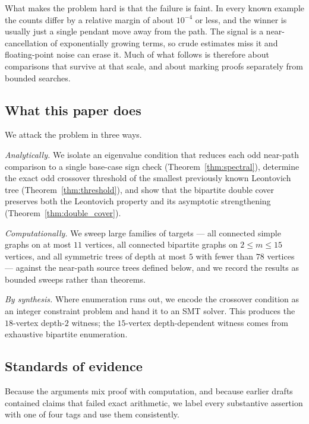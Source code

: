 What makes the problem hard is that the failure is faint. In every known
example the counts differ by a relative margin of about $10^{-4}$ or
less, and the winner is usually just a single pendant move away from the
path. The signal is a near-cancellation of exponentially growing terms,
so crude estimates miss it and floating-point noise can erase it. Much
of what follows is therefore about comparisons that survive at that
scale, and about marking proofs separately from bounded searches.

\subsection{What this paper does}

We attack the problem in three ways.

\emph{Analytically.} We isolate an eigenvalue condition that reduces each
odd near-path comparison to a single base-case sign check
(Theorem~\ref{thm:spectral}), determine the exact odd crossover
threshold of the smallest previously known Leontovich tree
(Theorem~\ref{thm:threshold}), and show that the bipartite double cover
preserves both the Leontovich property and its asymptotic strengthening
(Theorem~\ref{thm:double_cover}).

\emph{Computationally.} We sweep large families of targets --- all
connected simple graphs on at most $11$ vertices, all connected
bipartite graphs on $2 \le m \le 15$ vertices, and all symmetric trees
of depth at most $5$ with fewer than $78$ vertices --- against the
near-path source trees defined
below, and we record the results as bounded sweeps rather than theorems.

\emph{By synthesis.} Where enumeration runs out, we encode the
crossover condition as an integer constraint problem and hand it to an
SMT solver. This produces the $18$-vertex depth-$2$ witness; the
$15$-vertex depth-dependent witness comes from exhaustive bipartite
enumeration.

\subsection{Standards of evidence}
\label{sec:evidence}

Because the arguments mix proof with computation, and because earlier
drafts contained claims that failed exact arithmetic, we label every
substantive assertion with one of four tags and use them consistently.

